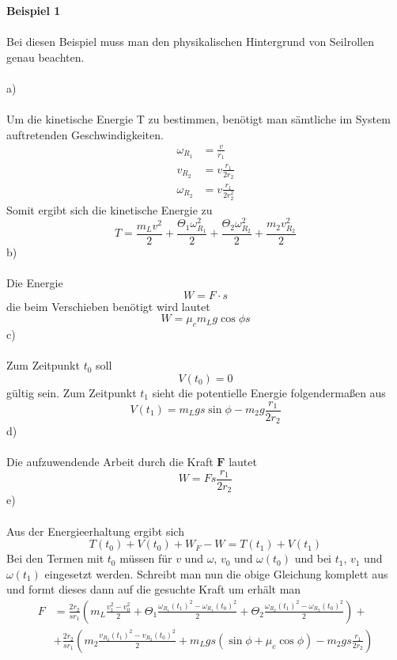 \textbf{Beispiel 1} \\ \\
Bei diesen Beispiel muss man den physikalischen Hintergrund von Seilrollen genau beachten. \\ \\
a)\\ \\
Um die kinetische Energie T zu bestimmen, benötigt man sämtliche im System auftretenden Geschwindigkeiten.
\begin{align*}
	\omega_{R_1} &= \frac{v}{r_1} \\
	v_{R_2} &= v \frac{r_1}{2r_2} \\
	\omega_{R_2} &= v\frac{r_1}{2r_2^2}
\end{align*}
Somit ergibt sich die kinetische Energie zu
\[
	T = \frac{m_Lv^2}{2} + \frac{\Theta_1\omega_{R_1}^2}{2} + \frac{\Theta_2\omega_{R_2}^2}{2} + \frac{m_2v_{R_2}^2}{2}
\]
b) \\ \\
Die Energie 
\[
	W = F \cdot s
\]
die beim Verschieben benötigt wird lautet
\[
	W = \mu_cm_Lg\cos\phi s
\]
c) \\ \\
Zum Zeitpunkt $t_0$ soll
\[
	V(t_0) = 0
\]
gültig sein.
Zum Zeitpunkt $t_1$ sieht die potentielle Energie folgendermaßen aus
\[
	V(t_1) = m_Lgs\sin\phi - m_2g\frac{r_1}{2r_2}
\]
d) \\ \\
Die aufzuwendende Arbeit durch die Kraft $\textbf{F}$ lautet
\[
	W = Fs\frac{r_1}{2r_2}
\]
e) \\ \\
Aus der Energieerhaltung ergibt sich
\[
	T(t_0) + V(t_0) + W_F - W = T(t_1) + V(t_1)
\]
Bei den Termen mit $t_0$ müssen für $v$ und $\omega$, $v_0$ und $\omega(t_0)$ und bei $t_1$, $v_1$ und $\omega(t_1)$ eingesetzt werden. Schreibt man nun die obige Gleichung komplett aus und formt dieses dann auf die gesuchte Kraft um erhält man
\begin{align*}
	F &=  \frac{2r_2}{sr_1}\left( m_L\frac{v_1^2 - v_0^2}{2} + \Theta_1 \frac{\omega_{R_1}(t_1)^2 - \omega_{R_1}(t_0)^2}{2} + \Theta_2 \frac{\omega_{R_2}(t_1)^2 - \omega_{R_2}(t_0)^2}{2}\right) + \\
	&+\frac{2r_2}{sr_1}  \left(m_2\frac{v_{R_2}(t_1)^2 - v_{R_2}(t_0)^2}{2} + m_Lgs(\sin\phi + \mu_c\cos\phi) - m_2gs\frac{r_1}{2r_2}\right)
\end{align*}